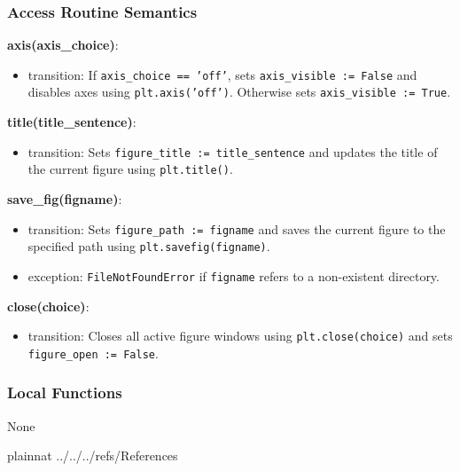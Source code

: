 \documentclass[12pt, titlepage]{article}
\begin{document}
\subsubsection{Access Routine Semantics}

\noindent \textbf{axis(axis\_choice)}:
\begin{itemize}
  \item transition: If \texttt{axis\_choice == 'off'}, sets \texttt{axis\_visible := False} and disables axes using \texttt{plt.axis('off')}. Otherwise sets \texttt{axis\_visible := True}.
\end{itemize}

\noindent \textbf{title(title\_sentence)}:
\begin{itemize}
  \item transition: Sets \texttt{figure\_title := title\_sentence} and updates the title of the current figure using \texttt{plt.title()}.
\end{itemize}

\noindent \textbf{save\_fig(figname)}:
\begin{itemize}
  \item transition: Sets \texttt{figure\_path := figname} and saves the current figure to the specified path using \texttt{plt.savefig(figname)}.
  \item exception: \texttt{FileNotFoundError} if \texttt{figname} refers to a non-existent directory.
\end{itemize}

\noindent \textbf{close(choice)}:
\begin{itemize}
  \item transition: Closes all active figure windows using \texttt{plt.close(choice)} and sets \texttt{figure\_open := False}.
\end{itemize}


\subsubsection{Local Functions}
None
















  

\newpage

 {plainnat}
 {../../../refs/References}
%
\end{document}
